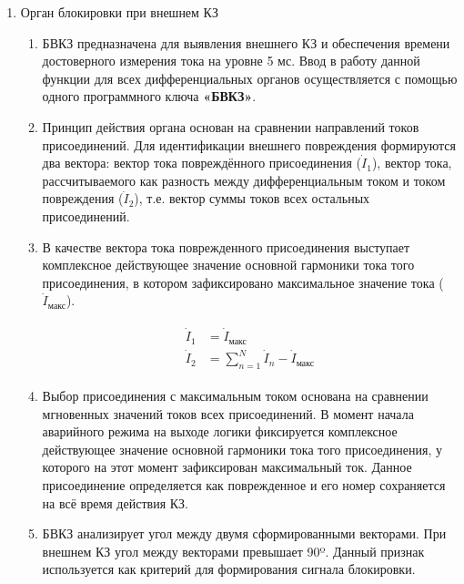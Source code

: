 \begin{enumerate}
\begin{enumerate}
\end{enumerate}


\item Орган блокировки при внешнем КЗ

\begin{enumerate}

\item
БВКЗ предназначена для выявления внешнего КЗ и обеспечения времени достоверного измерения тока на уровне 5 мс. Ввод в работу данной функции для всех дифференциальных органов осуществляется с помощью одного программного ключа \textbf{«БВКЗ»}.

\item
Принцип действия органа основан на сравнении направлений токов присоединений. Для идентификации внешнего повреждения формируются два вектора: вектор тока повреждённого присоединения ($ \dot{I}_1 $), вектор тока, рассчитываемого как разность между дифференциальным током и током повреждения ($ \dot{I}_2 $), т.е. вектор суммы токов всех остальных присоединений.

\item
В качестве вектора тока поврежденного присоединения выступает комплексное действующее значение основной гармоники тока того присоединения, в котором зафиксировано максимальное значение тока ($ \dot{I}_\textit{макс} $).

\begin{align}
\begin{split}
\dot{I}_1&=\dot{I}_\textit{макс}\\
\dot{I}_2&=\sum_{n=1}^N \dot{I}_{n} - \dot{I}_\textit{макс}
\end{split}
\end{align}

\item
Выбор присоединения с максимальным током основана на сравнении мгновенных значений токов всех присоединений. В момент начала аварийного режима на выходе логики фиксируется комплексное действующее значение основной гармоники тока того присоединения, у которого на этот момент зафиксирован максимальный ток. Данное присоединение определяется как поврежденное и его номер сохраняется на всё время действия КЗ.

\item
БВКЗ анализирует угол между двумя сформированными векторами. При внешнем КЗ угол между векторами превышает 90º. Данный признак используется как критерий для формирования сигнала блокировки.


\end{enumerate}
\end{enumerate}
